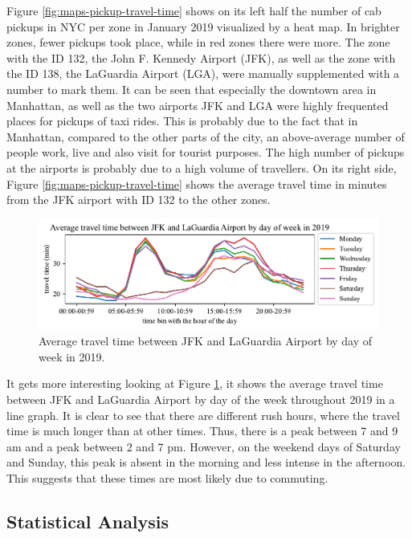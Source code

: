 \documentclass{article}
\begin{document}
Figure \ref{fig:maps-pickup-travel-time} shows on its left half the number of cab pickups in NYC per zone in January 2019 visualized by a heat map. In brighter zones, fewer pickups took place, while in red zones there were more. The zone with the ID 132, the John F. Kennedy Airport (JFK), as well as the zone with the ID 138, the LaGuardia Airport (LGA), were manually supplemented with a number to mark them. It can be seen that especially the downtown area in Manhattan, as well as the two airports JFK and LGA were highly frequented places for pickups of taxi rides. This is probably due to the fact that in Manhattan, compared to the other parts of the city, an above-average number of people work, live and also visit for tourist purposes. The high number of pickups at the airports is probably due to a high volume of travellers. On its right side, Figure \ref{fig:maps-pickup-travel-time} shows the average travel time in minutes from the JFK airport with ID 132 to the other zones.
\begin{figure}
  \vspace{-0.5cm}
  \setlength{}
  \centering
  \includegraphics[scale=0.70]{fig/travel-time-from-JFK-to-LGA.pdf}
  \caption{Average travel time between JFK and LaGuardia Airport by day of week in 2019.}
  \label{fig:travel-time-from-JFK-to-LGA}
\end{figure}
\setlength{\textfloatsep}{10pt}

It gets more interesting looking at Figure \ref{fig:travel-time-from-JFK-to-LGA}, it shows the average travel time between JFK and LaGuardia Airport by day of the week throughout 2019 in a line graph. It is clear to see that there are different rush hours, where the travel time is much longer than at other times. Thus, there is a peak between 7 and 9 am and a peak between 2 and 7 pm. However, on the weekend days of Saturday and Sunday, this peak is absent in the morning and less intense in the afternoon. This suggests that these times are most likely due to commuting.

\subsection{Statistical Analysis}
\end{document}
